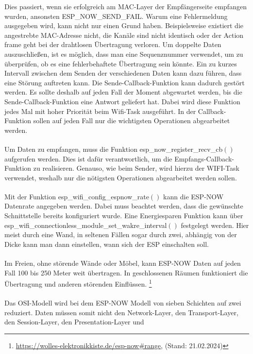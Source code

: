 \documentclass[titlepage,12pt,twoside]{article}
\begin{document}
Dies passiert, wenn sie erfolgreich am MAC-Layer der Empfängerseite empfangen wurden, ansonsten 
ESP\_NOW\_SEND\_FAIL. Warum eine Fehlermeldung ausgegeben wird, kann nicht 
nur einen Grund haben. Beispielsweise existiert die angestrebte MAC-Adresse 
nicht, die Kanäle sind nicht identisch oder der Action frame geht bei der 
drahtlosen Übertragung verloren. Um doppelte Daten auszuschließen, ist es 
möglich, dass man eine Sequenznummer verwendet, um zu überprüfen, ob es eine 
fehlerbehaftete Übertragung sein könnte. Ein zu kurzes Intervall zwischen 
dem Senden der verschiedenen Daten kann dazu führen, dass eine Störung 
auftreten kann. Die Sende-Callback-Funktion kann dadurch gestört werden. Es 
sollte deshalb auf jeden Fall der Moment abgewartet werden, bis die Sende-Callback-Funktion 
eine Antwort geliefert hat. Dabei wird diese Funktion jedes Mal mit hoher 
Priorität beim Wifi-Task ausgeführt. In der Callback-Funktion sollen auf 
jeden Fall nur die wichtigsten Operationen abgearbeitet werden. \\
\\
Um Daten zu empfangen, muss die Funktion esp\_now\_register\_recv\_cb$()$ aufgerufen 
werden. Dies ist dafür verantwortlich, um die Empfangs-Callback-Funktion zu 
realisieren. Genauso, wie beim Sender, wird hierzu der WIFI-Task verwendet, 
weshalb nur die nötigsten Operationen abgearbeitet werden sollen. \\
\\
Mit der Funktion esp\_wifi\_config\_espnow\_rate$()$ kann die ESP-NOW Datenrate angegeben 
werden. Dabei muss beachtet werden, dass die gewünschte Schnittstelle bereits 
konfiguriert wurde. Eine Energiesparen Funktion kann über 
esp\_wifi\_connectionless\_module\_set\_wakre\_interval$()$ festgelegt werden. Hier 
meist durch eine Wand, in seltenen Fällen sogar durch zwei, abhängig von der Dicke 
kann man dann einstellen, wann sich der ESP einschalten soll. \\
\\
Im Freien, ohne störende Wände oder Möbel, kann ESP-NOW Daten auf jeden Fall 100 
bis 250 Meter weit übertragen. In geschlossenen Räumen funktioniert die Übertragung 
und anderen störenden Einflüssen. \footnote{\url{https://wolles-elektronikkiste.de/esp-now\#range}, (Stand: 21.02.2024)} \\
\\
Das OSI-Modell wird bei dem ESP-NOW Modell von sieben Schichten auf 
zwei reduziert. Daten müssen somit nicht den Network-Layer, den 
Transport-Layer, den Session-Layer, den Presentation-Layer und 
\end{document}
